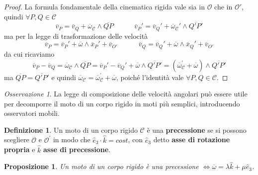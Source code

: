 \documentclass{book}
\theoremstyle{plain}
\theoremstyle{plain}
\theoremstyle{plain}
\theoremstyle{plain}
\theoremstyle{plain}
\newtheorem{prop}{Proposizione}[chapter]
\theoremstyle{definition}
\newtheorem{defi}{Definizione}[chapter]
\theoremstyle{remark}
\newtheorem*{oss}{Osservazione}
\theoremstyle{definition}
\begin{document}
\begin{proof}
    La formula fondamentale della cinematica rigida vale sia in $\mathcal{O}$ che in $\mathcal{O}'$, quindi $\forall P, Q \in \mathcal{C}$
    \begin{displaymath}
        \overline{v}_P=\overline{v}_Q+\overline{\omega}_{\mathcal{C}}\wedge\overline{QP} \quad \quad \quad \overline{v}_P'=\overline{v}_Q'+\overline{\omega}_{\mathcal{C}}'\wedge\overline{Q'P'}
    \end{displaymath}
    ma per la legge di trasformazione delle velocità
    \begin{displaymath}
        \overline{v}_P=\overline{v}_P'+\overline{\omega}\wedge\overline{x}_P'+\overline{v}_{O'} \quad \quad \quad \overline{v}_Q=\overline{v}_Q'+\overline{\omega}\wedge\overline{x}_Q'+\overline{v}_{O'}
    \end{displaymath}
    da cui ricaviamo
    \begin{displaymath}
        \overline{v}_P-\overline{v}_Q=\overline{\omega}_{\mathcal{C}}\wedge\overline{QP}=\overline{v}_P'-\overline{v}_Q'+\overline{\omega}\wedge\overline{Q'P'}=(\overline{\omega}_{\mathcal{C}}^{\prime}+\overline{\omega})\wedge\overline{Q'P'}
    \end{displaymath}
    ma $\overline{QP}=\overline{Q'P'}$ e quindi $\overline{\omega}_{\mathcal{C}}=\overline{\omega}_{\mathcal{C}}^{\prime}+\overline{\omega}$, poiché l'identità vale $\forall P, Q \in \mathcal{C}$.
\end{proof}

\begin{oss}
    La legge di composizione delle velocità angolari può essere utile per decomporre il moto di un corpo rigido in moti più semplici, introducendo osservatori mobili.
\end{oss}

\begin{defi}
    Un moto di un corpo rigido $\mathcal{C}$ è una \textbf{precessione} se si possono scegliere  $\mathcal{O}$ e $\mathcal{O}^{\prime}$ in modo che $\hat{e}_{3} \cdot \hat{k}= cost$, con $\hat{e}_{3}$ detto \textbf{asse di rotazione propria} e $\hat{k}$ \textbf{asse di precessione}.
\end{defi}

\begin{prop}
    Un moto di un corpo rigido è una precessione $\iff \overline{\omega}=\lambda\hat{k}+\mu\hat{e}_{3}$.
\end{prop}
\end{document}
